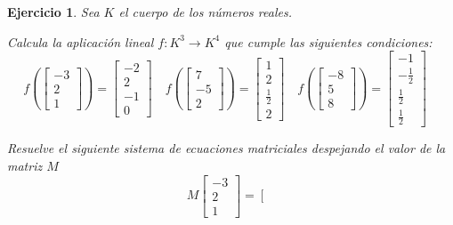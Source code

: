 \documentclass[12pt]{amsart}
\newtheorem{ejer}{Ejercicio}
\begin{document}
\begin{ejer} Sea $K$ el cuerpo de los n\'umeros reales.
\newline
\noindent\begin{minipage}{\textwidth}
\begin{tcolorbox}[colback = green!20!white,title=Versión Aplicación]
Calcula la aplicaci\'on lineal $f:K^{3} \to K^{4}$ que cumple las siguientes condiciones: 
\[f\left(\left[\begin{array}{r}
-3 \\
2 \\
1
\end{array}\right]\right) = \left[\begin{array}{r}
-2 \\
2 \\
-1 \\
0
\end{array}\right] \quad f\left(\left[\begin{array}{r}
7 \\
-5 \\
2
\end{array}\right]\right) = \left[\begin{array}{r}
1 \\
2 \\
\frac{1}{2} \\
2
\end{array}\right] \quad f\left(\left[\begin{array}{r}
-8 \\
5 \\
8
\end{array}\right]\right) = \left[\begin{array}{r}
-1 \\
-\frac{1}{2} \\
\frac{1}{2} \\
\frac{1}{2}
\end{array}\right] \quad 
\]\end{tcolorbox}
\end{minipage} \newline
\noindent\begin{minipage}{\textwidth}
\begin{tcolorbox}[colback = blue!20!white,title=Versión Sistema Matricial]
Resuelve el siguiente sistema de ecuaciones matriciales despejando el valor de la matriz $M$
\[M \left[\begin{array}{r}
-3 \\
2 \\
1
\end{array}\right] = \left[\begin{array}{r}

\end{array}\]
\end{tcolorbox}
\end{minipage}
\end{ejer}
\end{document}
